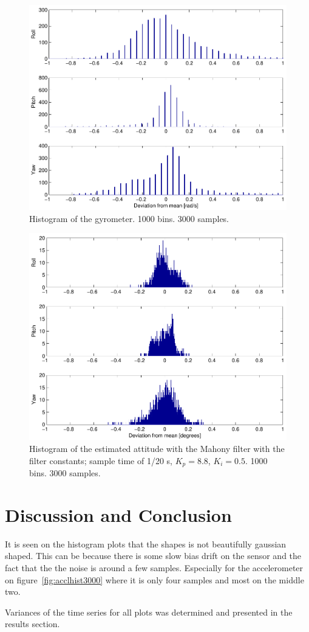 \begin{figure}[htpb]
	\centering
	\includegraphics[width=\textwidth]{pdf/gyrohist3000}
	\caption{Histogram of the gyrometer. 1000 bins. 3000 samples.}
	\label{fig:gyrohist3000}
\end{figure}

\begin{figure}[htpb]
	\centering
	\includegraphics[width=\textwidth]{pdf/mahonyhist3000}
	\caption{Histogram of the estimated attitude with the Mahony filter
	with the filter constants; sample time of 1/20 s, $K_p = 8.8$, $K_i
= 0.5$. 1000 bins. 3000 samples.}
	\label{fig:mahonyhist3000}
\end{figure}


\section{Discussion and Conclusion}
It is seen on the histogram plots that the shapes is not beautifully gaussian shaped. This can be because there is some slow bias drift on the sensor and the fact that the the noise is around a few samples. Especially for the accelerometer on figure~\vref{fig:acclhist3000} where it is only four samples and most on the middle two.

Variances of the time series for all plots was determined and presented in the results section.
